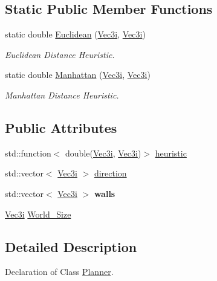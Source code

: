 \subsection*{Static Public Member Functions}
\begin{DoxyCompactItemize}
\item 
static double \hyperlink{classPlanner_a83d312b600eef6107513cbb39f083134}{Euclidean} (\hyperlink{structVec3i}{Vec3i}, \hyperlink{structVec3i}{Vec3i})
\begin{DoxyCompactList}\small\item\em Euclidean Distance Heuristic. \end{DoxyCompactList}\item 
static double \hyperlink{classPlanner_ad88eb501aedd40cdb3b60853ff7ad2b8}{Manhattan} (\hyperlink{structVec3i}{Vec3i}, \hyperlink{structVec3i}{Vec3i})
\begin{DoxyCompactList}\small\item\em Manhattan Distance Heuristic. \end{DoxyCompactList}\end{DoxyCompactItemize}
\subsection*{Public Attributes}
\begin{DoxyCompactItemize}
\item 
std\+::function$<$ double(\hyperlink{structVec3i}{Vec3i}, \hyperlink{structVec3i}{Vec3i})$>$ \hyperlink{classPlanner_a56d3e7453675b3f8be6e02e75ff2065e}{heuristic}
\item 
std\+::vector$<$ \hyperlink{structVec3i}{Vec3i} $>$ \hyperlink{classPlanner_a559fdca30a83a0da76d0538c8fe97379}{direction}
\item 
std\+::vector$<$ \hyperlink{structVec3i}{Vec3i} $>$ {\bfseries walls}\hypertarget{classPlanner_a44b47ff3ddda4a5d270000b69737970f}{}\label{classPlanner_a44b47ff3ddda4a5d270000b69737970f}

\item 
\hyperlink{structVec3i}{Vec3i} \hyperlink{classPlanner_a27c77443f0cf3e6b5197c0c3af56c3ca}{World\+\_\+\+Size}
\end{DoxyCompactItemize}


\subsection{Detailed Description}
Declaration of Class \hyperlink{classPlanner}{Planner}. 

